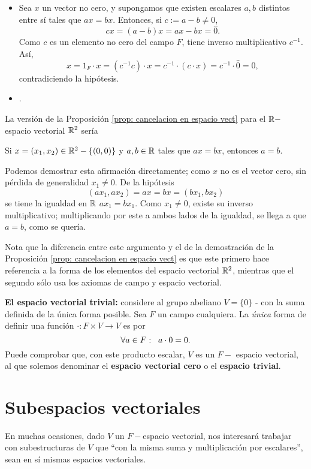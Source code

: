 \begin{itemize}
	\item Sea $x$ un vector no cero, y supongamos que existen escalares $a, b$ distintos
	entre sí tales que $ax = bx$. Entonces, si $c := a - b \neq 0$,
	\[
	c x = (a-b) x = ax - bx = \hat{0}.
	\]
	Como $c$ es un elemento no cero del campo $F$, tiene inverso multiplicativo $c^{-1}$.
	Así,
	\[
	x = 1_{F} \cdot x = (c^{-1} c) \cdot x = c^{-1} \cdot (c \cdot x) = c^{-1} \cdot
	\hat{0} = \hat{0}, 
	\]
	contradiciendo la hipótesis.
	\item {}.
\end{itemize}

\QEDB
\vspace{0.2cm}

La versión de la Proposición \ref{prop: cancelacion en espacio vect}
para el $\mathbb{R}-$espacio vectorial $\mathbb{R}^{2}$ sería
\begin{center}
	Si $x = (x_{1}, x_{2}) \in \mathbb{R}^{2}- \{ (0, 0) \}$ y $a, b \in \mathbb{R}$
	tales que $ax = bx$, entonces $a = b$.
\end{center}
Podemos demostrar esta afirmación directamente; como $x$ no es el vector cero,
sin pérdida de generalidad $x_{1} \neq 0$. De la hipótesis 
\[
(ax_{1}, ax_{2}) = a x = b x = (bx_{1}, bx_{2}) 
\]
se tiene la igualdad en $\mathbb{R}$ $ax_{1} = bx_{1}$. Como $x_{1} \neq 0$, existe su 
inverso multiplicativo; multiplicando por este a ambos lados de la igualdad, 
se llega a que $a = b$, como se quería.


Nota que la diferencia entre este argumento y el de la demostración de la
Proposición \ref{prop: cancelacion en espacio vect} es que este primero hace
referencia a la forma de los elementos del espacio vectorial $\mathbb{R}^{2}$, mientras
que el segundo sólo usa los axiomas de campo y espacio vectorial. 

\begin{ejem}
	\textbf{El espacio vectorial trivial:} considere al grupo abeliano $V = \{ 0 \}$ - con 
	la suma definida de la única forma posible. Sea $F$ un campo cualquiera. La
	\textit{única} forma de definir una función $\cdot : F \times V \longrightarrow V$
	es por
	\[
	\forall a \in F: \hspace{0.2cm} a \cdot 0 = 0.
	\]
	Puede comprobar que, con este producto escalar, $V$ es un $F-$ espacio vectorial, 
	al que solemos denominar el \textbf{espacio vectorial cero} o el 
	\textbf{espacio trivial}.
\end{ejem}

\section{Subespacios vectoriales}
En muchas ocasiones, dado $V$ un $F-$espacio vectorial, nos interesará trabajar
con subestructuras de $V$ que ``con la misma suma y multiplicación por escalares'', 
sean en sí mismas espacios vectoriales.

